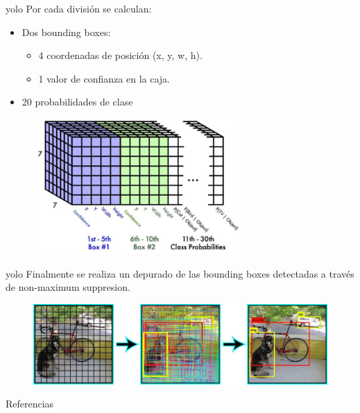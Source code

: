 \begin{frame}{\gls{yolo}}
Por cada división se calculan:
\begin{itemize}
    \item \alert{Dos bounding boxes}:
    \begin{itemize}
        \item 4 coordenadas de posición (x, y, w, h).
        \item 1 valor de confianza en la caja.
    \end{itemize}

    \item \alert{20 probabilidades de clase}
\end{itemize}

\begin{figure}
    \centering
    \includegraphics[width=0.7\textwidth]{figures/Tema 4/YOLO_End.png}
    \caption{\cite{YOLOFinal}}
\end{figure}
\end{frame}

\begin{frame}{\gls{yolo}}
Finalmente se realiza un \alert{depurado} de las \alert{bounding boxes} detectadas a través de \alert{non-maximum suppresion}.

\begin{figure}
    \centering
    \includegraphics[width=\textwidth]{figures/Tema 4/YOLO_FinalResults.jpg}
    \caption{\cite{YOLOResults}}
\end{figure}
\end{frame}


\begin{frame}[allowframebreaks]{Referencias}
    
    
\end{frame}

